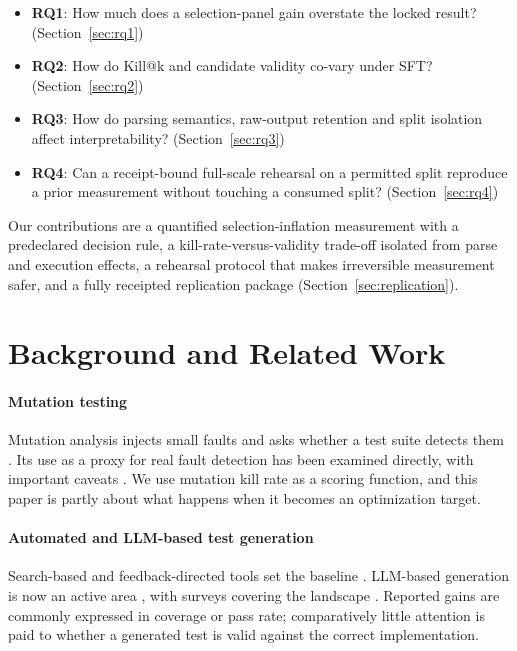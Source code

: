 \documentclass[10pt,conference,letterpaper]{IEEEtran}
\makeatletter
\newcommand{\killk}[1]{Kill@#1}
\makeatother
\begin{document}
\begin{itemize}
  \item \textbf{RQ1}: How much does a selection-panel gain overstate the locked
        result? (Section~\ref{sec:rq1})
  \item \textbf{RQ2}: How do \killk{k} and candidate validity co-vary under
        SFT? (Section~\ref{sec:rq2})
  \item \textbf{RQ3}: How do parsing semantics, raw-output retention and split
        isolation affect interpretability? (Section~\ref{sec:rq3})
  \item \textbf{RQ4}: Can a receipt-bound full-scale rehearsal on a permitted
        split reproduce a prior measurement without touching a consumed split?
        (Section~\ref{sec:rq4})
\end{itemize}

Our contributions are a quantified selection-inflation measurement with a
predeclared decision rule, a kill-rate-versus-validity trade-off isolated from
parse and execution effects, a rehearsal protocol that makes irreversible
measurement safer, and a fully receipted replication package
(Section~\ref{sec:replication}).

\section{Background and Related Work}

\paragraph{Mutation testing}
Mutation analysis injects small faults and asks whether a test suite detects
them \cite{jia2011mutation,papadakis2019mutation}. Its use as a proxy for real
fault detection has been examined directly, with important caveats
\cite{just2014mutants,papadakis2018mutationscores,just2014defects4j}. We use
mutation kill rate as a scoring function, and this paper is partly about what
happens when it becomes an optimization target.

\paragraph{Automated and LLM-based test generation}
Search-based and feedback-directed tools set the baseline
\cite{fraser2011evosuite,fraser2013wholesuite,pacheco2007randoop}. LLM-based
generation is now an active area \cite{lemieux2023codamosa,schafer2024llmunit,%
tufano2020athenatest}, with surveys covering the landscape
\cite{wang2024testingsurvey,hou2024llmse}. Reported gains are commonly expressed
in coverage or pass rate; comparatively little attention is paid to whether a
generated test is valid against the correct implementation.
\end{document}
